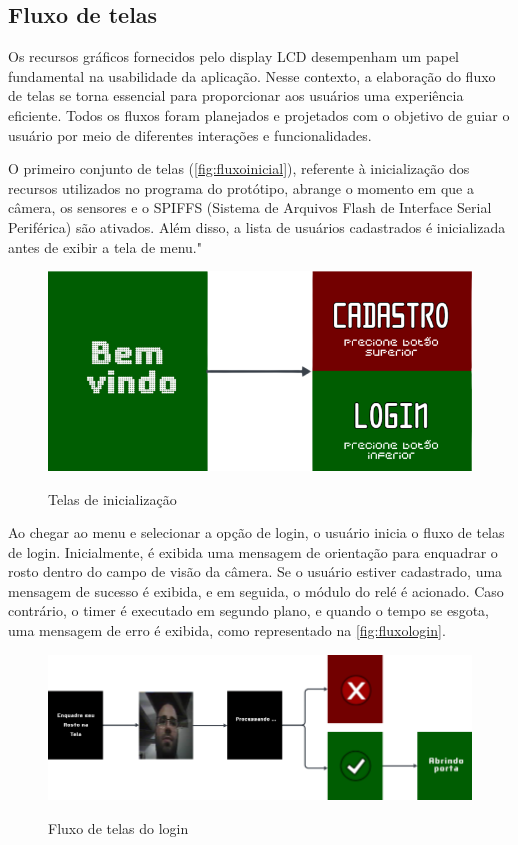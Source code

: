 \subsection{Fluxo de telas}\label{sec:telas}

Os recursos gráficos fornecidos pelo display LCD desempenham um papel 
fundamental na usabilidade da aplicação. Nesse contexto, a elaboração 
do fluxo de telas se torna essencial para proporcionar aos usuários 
uma experiência eficiente. Todos os fluxos foram planejados e 
projetados com o objetivo de guiar o usuário por meio 
de diferentes interações e funcionalidades.

O primeiro conjunto de telas (\autoref{fig:fluxoinicial}), referente à 
inicialização dos recursos utilizados no programa do protótipo, 
abrange o momento em que a câmera, os sensores e o SPIFFS 
(Sistema de Arquivos Flash de Interface Serial Periférica) 
são ativados. Além disso, a lista de usuários cadastrados é 
inicializada antes de exibir a tela de menu." 

\begin{figure}[h!]
    \centering
    \caption{Telas de inicialização}
    \includegraphics[scale=0.3]{figuras/fluxo_inicial.png}
    \fonte{}%
    \label{fig:fluxoinicial}
    \centering
\end{figure}

Ao chegar ao menu e selecionar a opção de login, o usuário inicia o 
fluxo de telas de login. Inicialmente, é exibida uma mensagem de 
orientação para enquadrar o rosto dentro do campo de visão da câmera. 
Se o usuário estiver cadastrado, uma mensagem de sucesso é exibida, 
e em seguida, o módulo do relé é acionado. Caso contrário, o timer 
é executado em segundo plano, e quando o tempo se esgota, uma mensagem 
de erro é exibida, como representado na \autoref{fig:fluxologin}.

\begin{figure}[h!]
    \centering
    \caption{Fluxo de telas do login}
    \includegraphics[scale=2.2]{figuras/fluxo_login.png}
    \fonte{}%
    \label{fig:fluxologin}
    \centering
\end{figure}

